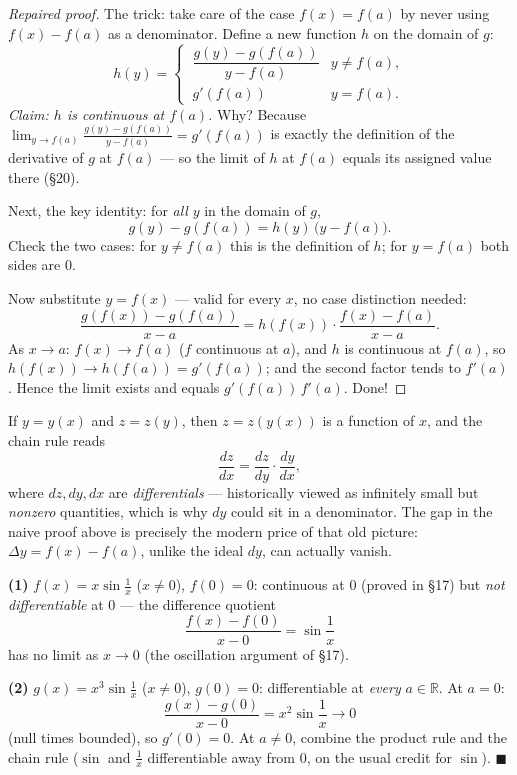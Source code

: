 \documentclass[11pt]{report}
\begin{document}
\begin{proof}[Repaired proof]
The trick: take care of the case $f(x) = f(a)$ by never using $f(x) - f(a)$ as a denominator. Define a new function $h$ on the domain of $g$:
\[
h(y) =
\begin{cases}
\ \dfrac{g(y) - g(f(a))}{y - f(a)} & y \neq f(a), \\[2mm]
\ g'(f(a)) & y = f(a).
\end{cases}
\]
\emph{Claim: $h$ is continuous at $f(a)$.} Why? Because $\lim_{y \to f(a)} \tfrac{g(y)-g(f(a))}{y - f(a)} = g'(f(a))$ is exactly the definition of the derivative of $g$ at $f(a)$ --- so the limit of $h$ at $f(a)$ equals its assigned value there (\S 20).

Next, the key identity: for \emph{all} $y$ in the domain of $g$,
\[
g(y) - g(f(a)) = h(y)\,\bigl(y - f(a)\bigr).
\]
Check the two cases: for $y \neq f(a)$ this is the definition of $h$; for $y = f(a)$ both sides are $0$.

Now substitute $y = f(x)$ --- valid for every $x$, no case distinction needed:
\[
\frac{g(f(x)) - g(f(a))}{x - a} = h(f(x)) \cdot \frac{f(x) - f(a)}{x - a}.
\]
As $x \to a$: $f(x) \to f(a)$ ($f$ continuous at $a$), and $h$ is continuous at $f(a)$, so $h(f(x)) \to h(f(a)) = g'(f(a))$; and the second factor tends to $f'(a)$. Hence the limit exists and equals $g'(f(a))\, f'(a)$. Done!
\end{proof}

\begin{rembox}
If $y = y(x)$ and $z = z(y)$, then $z = z(y(x))$ is a function of $x$, and the chain rule reads
\[
\frac{dz}{dx} = \frac{dz}{dy} \cdot \frac{dy}{dx},
\]
where $dz, dy, dx$ are \emph{differentials} --- historically viewed as infinitely small but \emph{nonzero} quantities, which is why $dy$ could sit in a denominator. The gap in the naive proof above is precisely the modern price of that old picture: $\Delta y = f(x) - f(a)$, unlike the ideal $dy$, can actually vanish.
\end{rembox}

\begin{exbox}
\textbf{(1)} $f(x) = x \sin\tfrac1x$ ($x \neq 0$), $f(0) = 0$: continuous at $0$ (proved in \S 17) but \emph{not differentiable} at $0$ --- the difference quotient
\[
\frac{f(x) - f(0)}{x - 0} = \sin\frac1x
\]
has no limit as $x \to 0$ (the oscillation argument of \S 17).

\textbf{(2)} $g(x) = x^3 \sin\tfrac1x$ ($x \neq 0$), $g(0) = 0$: differentiable at \emph{every} $a \in \mathbb{R}$. At $a = 0$:
\[
\frac{g(x) - g(0)}{x - 0} = x^2 \sin\frac1x \longrightarrow 0
\]
(null times bounded), so $g'(0) = 0$. At $a \neq 0$, combine the product rule and the chain rule ($\sin$ and $\tfrac1x$ differentiable away from $0$, on the usual credit for $\sin$). \hfill $\blacksquare$
\end{exbox}
\end{document}
